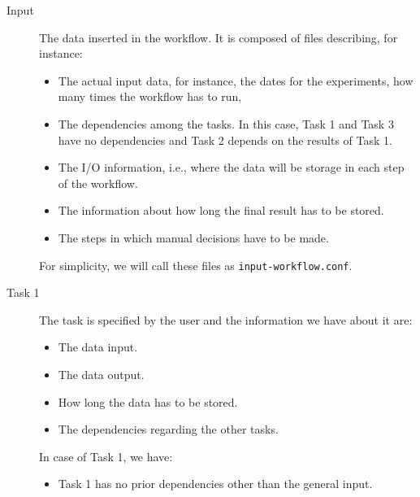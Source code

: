 \documentclass[a4paper, twocolumn]{article}
\begin{document}
\begin{description}

\item[Input] The data inserted in the workflow. It is composed of files describing, for instance:

\begin{itemize}

\item The actual input data, for instance, the dates for the experiments, how many times the workflow has to run,

\item The dependencies among the tasks. In this case, Task 1 and Task 3 have no dependencies and Task 2 depends on the results of Task 1.

\item The I/O information, i.e., where the data will be storage in each step of the workflow.

\item The information about how long the final result has to be stored.

\item The steps in which manual decisions have to be made.

\end{itemize}

For simplicity, we will call these files as \texttt{input-workflow.conf}.

\item[Task 1] The task is specified by the user and the information we have about it are:

\begin{itemize}

\item The data input.

\item The data output.

\item How long the data has to be stored.

\item The dependencies regarding the other tasks.

\end{itemize}

In case of Task 1, we have:

\begin{itemize}

\item Task 1 has no prior dependencies other than the general input.


\end{itemize}
\end{description}
\end{document}
